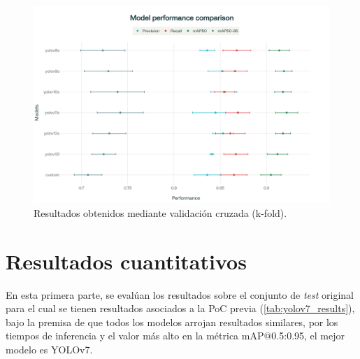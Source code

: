 \documentclass[12pt,a4paper,onecolumn,oneside]{report}
\begin{document}
\begin{figure}[H]
  \centering
  \includegraphics[width=1.0\textwidth]{figuras/k-fold/Yolo_k-fold.png}
  \caption{Resultados obtenidos mediante validación cruzada (k-fold).}
  \label{fig:yolo_k-fold}
\end{figure}

\section{Resultados cuantitativos}
\label{sec:Resultados cuantitativos}

En esta primera parte, se evalúan los resultados sobre el conjunto de \textit{test} original para el cual se tienen resultados asociados
a la PoC previa (\autoref{tab:yolov7_results}), bajo la premisa de que todos los modelos arrojan resultados similares, por los tiempos de inferencia y 
el valor más alto en la métrica mAP@0.5:0.95, el mejor modelo es YOLOv7.

\begin{table}[H]
  \caption{Resultados de los modelos en la prueba de concepto inicial \cite{HamiltonThorneRoundCells}}
  \centering
  \label{tab:yolov7_results}
\end{table}
\end{document}
